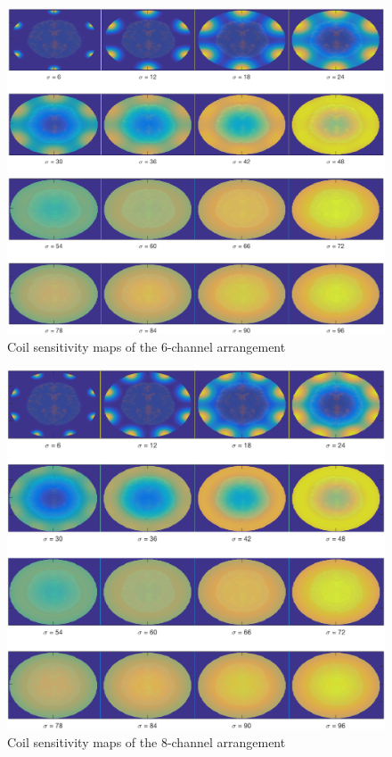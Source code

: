 \begin{figure}[H]
    \centering
    \includegraphics[width=.8\textwidth,keepaspectratio]{6coilsdifsigmas}
    \caption{Coil sensitivity maps of the 6-channel arrangement}
\end{figure}

\begin{figure}[H]
    \centering
    \includegraphics[width=.8\textwidth,keepaspectratio]{8coilsdifsigmas}
    \caption{Coil sensitivity maps of the 8-channel arrangement}
\end{figure}

